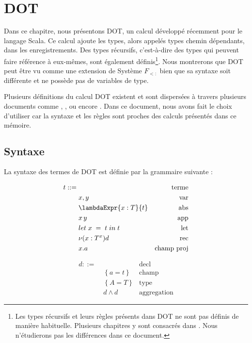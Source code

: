 \chapter{DOT}

Dans ce chapitre, nous présentons DOT, un calcul développé récemment pour le
langage Scala. Ce calcul ajoute les types, alors
appelés types chemin dépendants, dans les enregistrements. Des types
récursifs, c'est-à-dire des types qui peuvent faire référence à eux-mêmes, sont
également définis\footnote{Les types récursifs et leurs règles présents dans DOT ne sont pas
  définis de manière habituelle. Plusieurs chapitres y sont consacrés dans
  \cite{tapl-recursive-types}. Nous n'étudierons pas les différences dans ce document.
}.
Nous montrerons que DOT peut être vu comme une
extension de Système $F_{<:}$ bien que sa syntaxe soit différente et ne possède
pas de variables de type.

Plusieurs définitions du calcul DOT existent et sont dispersées à travers
plusieurs documents comme \cite{nada-amin-thesis}, \cite{OOPSLA-DOT-2016},
\cite{POPL-2017-DOT} ou encore \cite{WF-DOT-2016}. Dans ce document, nous avons
fait le choix d'utiliser \cite{WF-DOT-2016} car la syntaxe et les règles sont
proches des calculs présentés dans ce mémoire.

\section{Syntaxe}

La syntaxe des termes de DOT est définie par la grammaire suivante :
\begin{minipage}{0.45\textwidth}
  \begin{align*}
    t ::= & \, & \text{terme} \\
          & \; x, y & \text{var} \\
          & \; \lambdaExpr{x : T}{t} & \text{abs} \\
          & \; x \, y & \text{app} \\
          & \; \localLetBinding{x}{t}{t} & \text{let} \\
          & \; \nu(x : T^{x})d & \text{rec} \\
          & \; x.a & \text{champ proj} \\
\end{align*}
\end{minipage}
\begin{minipage}{0.45\textwidth}
  \begin{align*}
    d ::= & \, & \text{decl} \\
          & \; \left\{ a = t \right\} & \text{champ} \\
          & \; \left\{ A = T \right\} & \text{type} \\
          & \; d \wedge d & \text{aggregation}
\end{align*}
\end{minipage}

